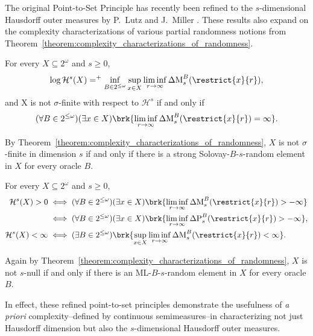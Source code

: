 The original Point-to-Set Principle has recently been refined to the $s$-dimensional Hausdorff outer measures by P.~Lutz and J.~Miller \cite{LM24}. These results also expand on the complexity characterizations of various partial randomness notions from Theorem~\ref{theorem:complexity_characterizations_of_randomness}.

\begin{theorem} 
    \label{theorem:PTS_log_s_measure_and_sigma_finite}
    For every $X \subseteq 2^\omega$ and $s \geq 0$,
    \begin{align*}
        \log \mathcal{H}^s(X) =^+ \inf_{B \in 2^{\leq \omega}} \sup_{x \in X} \liminf_{r \to \infty}  \operatorname{\Delta M}^B_s(\restrict{x}{r}),
    \end{align*}
    and X is not $\sigma$-finite with respect to $\mathcal{H}^s$ if and only if
    \begin{align*}
        (\forall B \in 2^{\leq \omega})(\exists x \in X) \brk{ \liminf_{r \to \infty} \operatorname{\Delta M}^B_s(\restrict{x}{r}) = \infty }.
    \end{align*}
\end{theorem}

By Theorem~\ref{theorem:complexity_characterizations_of_randomness}, $X$ is not $\sigma$-finite in dimension $s$ if and only if there is a strong Solovay-$B$-$s$-random element in $X$ for every oracle $B$. 

\begin{corollary}
    \label{corollary:PTS_null_or_finite}
    For every $X \subseteq 2^\omega$ and $s \geq 0$,
    \begin{align*}
        \mathcal{H}^s(X) > 0 & \iff(\forall B \in 2^{\leq \omega})(\exists x \in X)\brk{\liminf_{r \to \infty} \operatorname{\Delta M}_s^B(\restrict{x}{r}) > -\infty}\\
        & \iff(\forall B \in 2^{\leq \omega})(\exists x \in X)\brk{\liminf_{r \to \infty} \operatorname{\Delta P}_s^B(\restrict{x}{r}) > -\infty}, \\
        \mathcal{H}^s(X) < \infty &\iff (\exists B \in 2^{\leq \omega}) \brk{\sup_{x \in X} \liminf_{r \to \infty} \operatorname{\Delta M}_s^B(\restrict{x}{r}) < \infty}.
    \end{align*} 
\end{corollary}

Again by Theorem~\ref{theorem:complexity_characterizations_of_randomness}, $X$ is not $s$-null if and only if there is an ML-$B$-$s$-random element in $X$ for every oracle $B$. 

In effect, these refined point-to-set principles demonstrate the usefulness of \textit{a priori} complexity--defined by continuous semimeasures--in characterizing not just Hausdorff dimension but also the $s$-dimensional Hausdorff outer measures. 